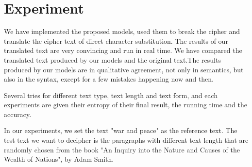 \documentclass{acmtog} %
\begin{document}
\section{Experiment}
\label{sec:results}
We have implemented the proposed models, used them to break the cipher and translate the cipher text of direct character substitution.  The results of our translated text 
are very convincing and run in real time. We have compared the translated text produced by our models and the original text.The results produced by our models are in qualitative agreement, not only in semantics, but also in the syntax, except for a few mistakes happening now and then.\\
\begin{table}[ht]
    \centering
\label{tab:symbols}
\begin{tabnote}
Several tries for different text type, text length and text form, and each experiments are given their entropy of their final result, the running time and the accuracy.
\end{tabnote}
\end{table}
In our experiments, we set the text "war and peace" as the reference text. The test text we want to decipher is the paragraphs with different text length that are randomly chosen from the book "An Inquiry into the Nature and Causes of the Wealth of Nations", by Adam Smith.\\
\end{document}
